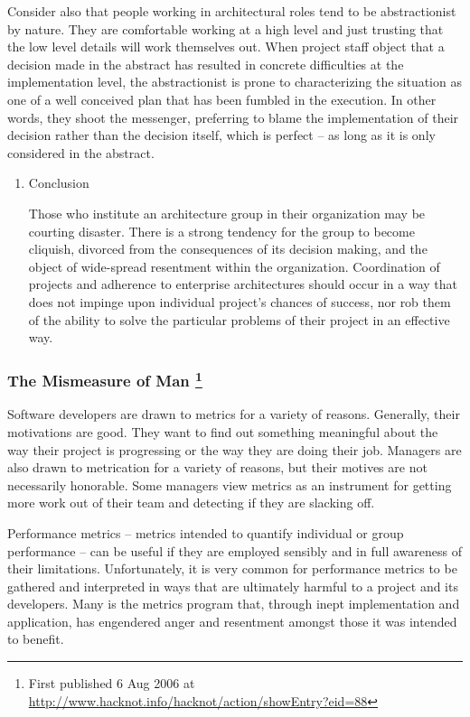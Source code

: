 \documentclass{article}
\begin{document}
Consider also that people working in architectural roles tend to be
abstractionist by nature. They are comfortable working at a high level
and just trusting that the low level details will work themselves out.
When project staff object that a decision made in the abstract has
resulted in concrete difficulties at the implementation level, the
abstractionist is prone to characterizing the situation as one of a well
conceived plan that has been fumbled in the execution. In other words,
they shoot the messenger, preferring to blame the implementation of
their decision rather than the decision itself, which is perfect -- as
long as it is only considered in the abstract.

\begin{enumerate}
\item Conclusion
\label{sec:orgheadline163}

Those who institute an architecture group in their organization may be
courting disaster. There is a strong tendency for the group to become
cliquish, divorced from the consequences of its decision making, and the
object of wide-spread resentment within the organization. Coordination
of projects and adherence to enterprise architectures should occur in a
way that does not impinge upon individual project's chances of success,
nor rob them of the ability to solve the particular problems of their
project in an effective way.
\end{enumerate}

\subsubsection{The Mismeasure of Man  \footnote{First published 6 Aug 2006 at
\url{http://www.hacknot.info/hacknot/action/showEntry?eid=88}}}
\label{sec:orgheadline178}

Software developers are drawn to metrics for a variety of reasons.
Generally, their motivations are good. They want to find out something
meaningful about the way their project is progressing or the way they
are doing their job. Managers are also drawn to metrication for a
variety of reasons, but their motives are not necessarily honorable.
Some managers view metrics as an instrument for getting more work out of
their team and detecting if they are slacking off.

Performance metrics -- metrics intended to quantify individual or group
performance -- can be useful if they are employed sensibly and in full
awareness of their limitations. Unfortunately, it is very common for
performance metrics to be gathered and interpreted in ways that are
ultimately harmful to a project and its developers. Many is the metrics
program that, through inept implementation and application, has
engendered anger and resentment amongst those it was intended to
benefit.
\end{document}
